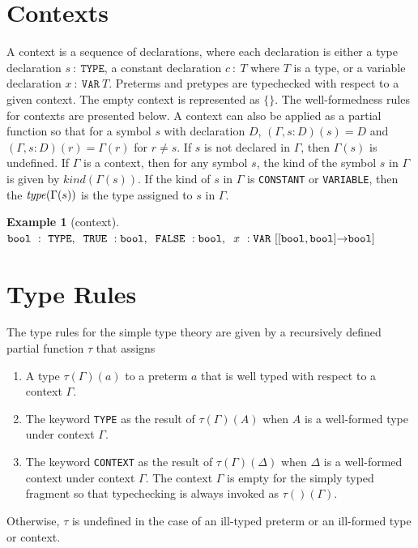\documentclass [12pt,twoside]{cslreport}
\newcommand{\thmbox}
   {{\ \hfill\hbox{%
      \vrule width1.0ex height1.0ex
   }\parfillskip 0pt }}
\newtheorem{example}[thm]{Example}
\newcommand{\aro}{\mathord\rightarrow} %
\newcommand{\funtype}[2]{[#1 \aro #2]}
\newcommand{\tupletype}[1]{[#1]}
\newcommand{\tauGamma}[1]{\tau(\Gamma)(#1)}
\newenvironment{Eg}[1]{\begin{example}[#1]\label{eg:#1}\em }{\thmbox\end{example}}
\begin{document}
\section{Contexts}

A context is 
 a sequence of
declarations, where each declaration is either a type declaration
$s\ :\ \mathtt{TYPE}$, a constant declaration $c\ :\ T$ where $T$ is a type,
or a variable declaration $x\ :\ \mathtt{VAR}\ T$.
Preterms and pretypes are typechecked with respect to a given context.  
The empty context is represented as $\{\}$\@.  
The well-formedness rules
for contexts are presented below.
A context can also be applied as a
partial function so that for a symbol $s$ with declaration $D$, $(\Gamma, s
: D)(s) = D$ and 
$(\Gamma, s : D)(r) = \Gamma(r)$ for $r\neq s$.
If $s$ is not declared in $\Gamma$, then $\Gamma(s)$ is undefined. 
If $\Gamma$ is a context, then
for any symbol $s$, the kind of the symbol $s$ in $\Gamma$ is given by $\textit{kind}(\Gamma(s))$.  If the kind of $s$ in $\Gamma$ is \texttt{CONSTANT} or
\texttt{VARIABLE}, then the $ \textit{type\/}(\Gamma(s))$ is the type assigned
to $s$ in $\Gamma$.  
\newcommand{\coln}[2]{#1\ : #2}

\begin{Eg}{context}\hfill\\
$ \mathtt{bool}\ :\  \mathtt{TYPE},\hspace{.2cm} \coln{ \mathtt{TRUE}}{
\mathtt{bool}},\hspace{.2cm} \coln{ \mathtt{FALSE}}{
\mathtt{bool}},\hspace{.2cm} \coln{x}{ \mathtt{VAR}\ \funtype{\tupletype{
\mathtt{bool}, \mathtt{bool}}}{ \mathtt{bool} }}$ 
\end{Eg}


\section{Type Rules}

The type rules for the simple type theory are given by a recursively
defined partial function
$\tau$ that assigns
\begin{enumerate}
\item  A type $\tau(\Gamma)(a)$ to a preterm $a$ that
is well typed with
respect to a context $\Gamma$. 
\item  The keyword \texttt{TYPE} as the result of $\tauGamma{A}$
when $A$ is a  well-formed type under context $\Gamma$\@.

\item  The keyword \texttt{CONTEXT} as the result of
$\tauGamma{\Delta}$ when $\Delta$ is a well-formed context
under context $\Gamma$\@.  The context $\Gamma$ is empty for the
simply typed fragment so that typechecking is always invoked as
$\tau()(\Gamma)$\@. 
\end{enumerate}
Otherwise, $\tau$ is undefined in the case of an ill-typed preterm or an
ill-formed type or context. 
\end{document}
